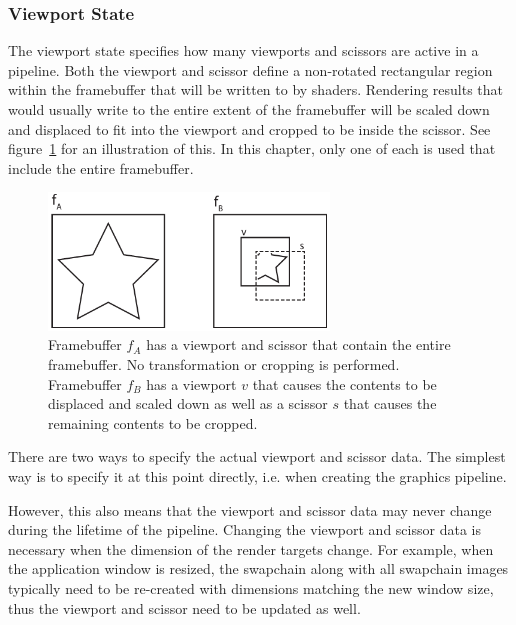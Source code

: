       \subsubsection{Viewport State}
        \label{sss:ViewportState}
        The viewport state specifies how many viewports and scissors are active in a pipeline.
        Both the viewport and scissor define a non-rotated rectangular region within the framebuffer that will be written to by shaders.
        Rendering results that would usually write to the entire extent of the framebuffer will be scaled down and displaced to fit into the viewport and cropped to be inside the scissor.
        See figure~\ref{fig:ViewportScissorSample} for an illustration of this.
        In this chapter, only one of each is used that include the entire framebuffer.

        \begin{figure}
          \includegraphics[width=0.666\textwidth]{Main/Images/ViewportScissorSample}
          \centering
          \caption{Framebuffer {\large$f_A$} has a viewport and scissor that contain the entire framebuffer. No transformation or cropping is performed. Framebuffer {\large$f_B$} has a viewport {\large$v$} that causes the contents to be displaced and scaled down as well as a scissor {\large$s$} that causes the remaining contents to be cropped.}
          \label{fig:ViewportScissorSample}
        \end{figure}

        There are two ways to specify the actual viewport and scissor data.
        The simplest way is to specify it at this point directly, i.e. when creating the graphics pipeline.

        However, this also means that the viewport and scissor data may never change during the lifetime of the pipeline.
        Changing the viewport and scissor data is necessary when the dimension of the render targets change.
        For example, when the application window is resized, the swapchain along with all swapchain images typically need to be re-created with dimensions matching the new window size, thus the viewport and scissor need to be updated as well.

